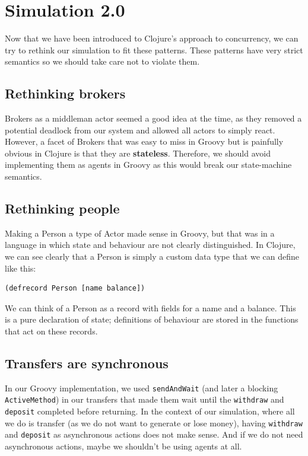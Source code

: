 \documentclass[a4paper,12pt]{kth-mag}
\begin{document}
\section{Simulation 2.0}

Now that we have been introduced to Clojure's approach to concurrency, we can try to rethink our simulation to fit these patterns. These patterns have very strict semantics so we should take care not to violate them.

\subsection{Rethinking brokers}

Brokers as a middleman actor seemed a good idea at the time, as they removed a potential deadlock from our system and allowed all actors to simply react. However, a facet of Brokers that was easy to miss in Groovy but is painfully obvious in Clojure is that they are \textbf{stateless}. Therefore, we should avoid implementing them as agents in Groovy as this would break our state-machine semantics.

\subsection{Rethinking people}

Making a Person a type of Actor made sense in Groovy, but that was in a language in which state and behaviour are not clearly distinguished. In Clojure, we can see clearly that a Person is simply a custom data type that we can define like this:

\begin{listing}[H]
	\begin{verbatim}
(defrecord Person [name balance])
	\end{verbatim}
\end{listing}

We can think of a Person as a record with fields for a name and a balance. This is a pure declaration of state; definitions of behaviour are stored in the functions that act on these records.

\subsection{Transfers are synchronous}

In our Groovy implementation, we used \texttt{sendAndWait} (and later a blocking \texttt{ActiveMethod}) in our transfers that made them wait until the \texttt{withdraw} and \texttt{deposit} completed before returning. In the context of our simulation, where all we do is transfer (as we do not want to generate or lose money), having \texttt{withdraw} and \texttt{deposit} as asynchronous actions does not make sense. And if we do not need asynchronous actions, maybe we shouldn't be using agents at all.
\end{document}
